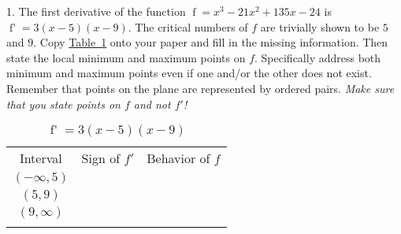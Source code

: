 \documentclass[12pt,]{book}
\theoremstyle{plain}
\theoremstyle{definition}
\numberwithin{equation}{section}
\newcommand{\hrulethin}  {\noalign{\hrule height 0.04em}}
\newcommand{\hrulemedium}{\noalign{\hrule height 0.07em}}
\newcommand{\hrulethick} {\noalign{\hrule height 0.11em}}
\providecommand\phantomsection{}
\newcommand{\fe}[2]{\mathop{{#1}{\left(#2\right)}}}
\newcommand{\ointerval}[2]{\left(#1,#2\right)}
\newcommand{\fd}[1]{#1'}
\begin{document}
\begin{multicols}{2}
\begin{exerciselist}
\item[1.]\phantomsection\hypertarget{exercise-21}{\null}The first derivative of the function \(\fe{f}{x}=x^3-21x^2+135x-24\) is \(\fe{\fd{f}}{x}=3(x-5)(x-9)\). The critical numbers of \(f\) are trivially shown to be \(5\) and \(9\). Copy \hyperref[table-polynomial-sign-table]{Table~\ref*{table-polynomial-sign-table}} onto your paper and fill in the missing information.  Then state the local minimum and maximum points on \(f\).  Specifically address both minimum and maximum points even if one and/or the other does not exist.  Remember that points on the plane are represented by ordered pairs. \emph{Make sure that you state points on \(f\) and not \(\fd{f}\)!}%
\vfill
\columnbreak
\begin{table}
\centering
\caption{\(\fe{\fd{f}}{x}=3(x-5)(x-9)\)\label{table-polynomial-sign-table}}
\begin{tabular}{ccc}\hrulethick
Interval&Sign of \(\fd{f}\)&Behavior of \(f\)\\\hrulemedium
\(\ointerval{-\infty}{5}\)&\(\phantom{\text{negative}}\)&\(\phantom{\text{decreasing}}\)\\\hrulethin
\(\ointerval{5}{9}\)&&\\\hrulethin
\(\ointerval{9}{\infty}\)&&\\\hrulethick
\end{tabular}
\end{table}
\par\smallskip
\end{exerciselist}
\end{multicols}%
\end{document}
